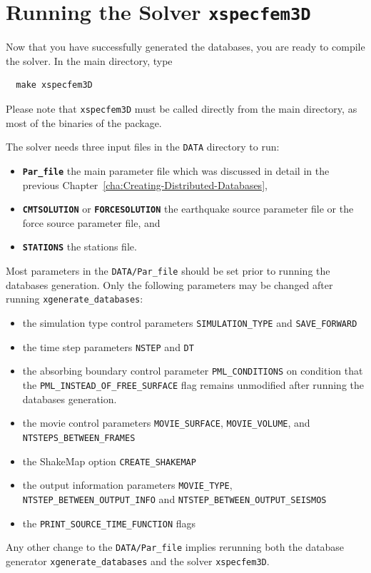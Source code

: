 \chapter{Running the Solver \texttt{xspecfem3D}}\label{cha:Running-the-Solver}

Now that you have successfully generated the databases, you are ready
to compile the solver. In the main directory, type
{\small
\begin{verbatim}
  make xspecfem3D
\end{verbatim}
}
\noindent
Please note that \texttt{xspecfem3D} must be called directly from
the main directory, as most of the binaries of the package.\newline

\noindent
The solver needs three input files in the \texttt{DATA} directory
to run:
\begin{itemize}
\item {\bf \texttt{Par\_file}} the main parameter file which was discussed
in detail in the previous Chapter~\ref{cha:Creating-Distributed-Databases},
\item {\bf \texttt{CMTSOLUTION}} or {\bf \texttt{FORCESOLUTION}} the earthquake
source parameter file or the force source parameter file, and
\item {\bf \texttt{STATIONS}} the stations file.
\end{itemize}

\noindent
Most parameters in the \texttt{DATA/Par\_file} should be set prior to running
the databases generation. Only the following parameters may be changed
after running \texttt{xgenerate\_databases}:
\begin{itemize}
\item the simulation type control parameters \texttt{SIMULATION\_TYPE}
and \texttt{SAVE\_FORWARD}
\item the time step parameters \texttt{NSTEP} and \texttt{DT}
\item the absorbing boundary control parameter \texttt{PML\_CONDITIONS}
on condition that the\newline
 \texttt{PML\_INSTEAD\_OF\_FREE\_SURFACE} flag remains unmodified
after running the databases generation.
\item the movie control parameters \texttt{MOVIE\_SURFACE}, \texttt{MOVIE\_VOLUME},
and \texttt{NTSTEPS\_BETWEEN\_FRAMES}
\item the ShakeMap\textregistered{} option \texttt{CREATE\_SHAKEMAP}
\item the output information parameters \texttt{MOVIE\_TYPE}, \texttt{NTSTEP\_BETWEEN\_OUTPUT\_INFO} and\newline
\texttt{NTSTEP\_BETWEEN\_OUTPUT\_SEISMOS}
\item the \texttt{PRINT\_SOURCE\_TIME\_FUNCTION} flags
\end{itemize}
Any other change to the \texttt{DATA/Par\_file} implies rerunning both
the database generator \texttt{xgenerate\_databases} and the solver
\texttt{xspecfem3D}.\newline


